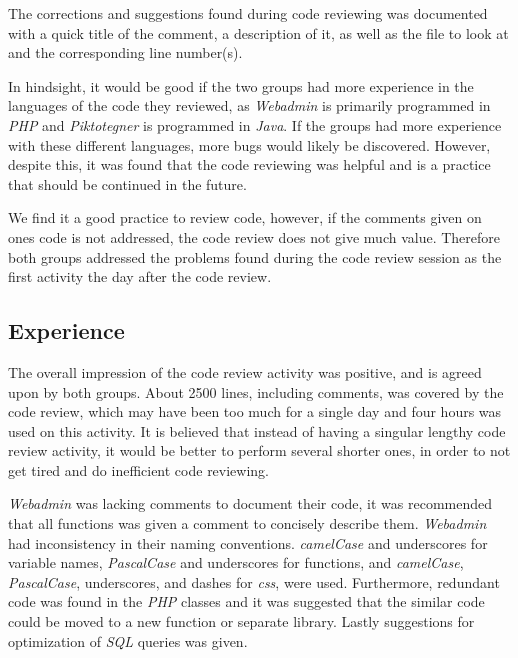 The corrections and suggestions found during code reviewing was documented with a quick title of the comment, a description of it, as well as the file to look at and the corresponding line number(s).

In hindsight, it would be good if the two groups had more experience in the languages of the code they reviewed, as \textit{Webadmin} is primarily programmed in \textit{PHP} and \textit{Piktotegner} is programmed in \textit{Java}.
If the groups had more experience with these different languages, more bugs would likely be discovered.
However, despite this, it was found that the code reviewing was helpful and is a practice that should be continued in the future.

We find it a good practice to review code, however, if the comments given on ones code is not addressed, the code review does not give much value.
Therefore both groups addressed the problems found during the code review session as the first activity the day after the code review.

\subsection*{Experience}
The overall impression of the code review activity was positive, and is agreed upon by both groups.
About 2500 lines, including comments, was covered by the code review, which may have been too much for a single day and four hours was used on this activity.
It is believed that instead of having a singular lengthy code review activity, it would be better to perform several shorter ones, in order to not get tired and do inefficient code reviewing.

\textit{Webadmin} was lacking comments to document their code, it was recommended that all functions was given a comment to concisely describe them. 
\textit{Webadmin} had inconsistency in their naming conventions. 
\textit{camelCase} and underscores for variable names, \textit{PascalCase} and underscores for functions, and \textit{camelCase}, \textit{PascalCase}, underscores, and dashes for \textit{css}, were used. 
Furthermore, redundant code was found in the \textit{PHP} classes and it was suggested that the similar code could be moved to a new function or separate library. 
Lastly suggestions for optimization of \textit{SQL} queries was given.

